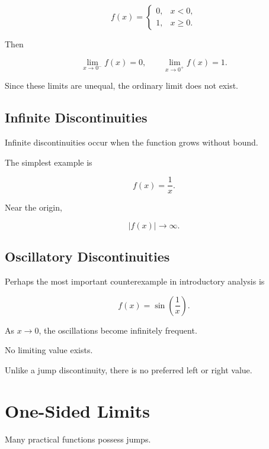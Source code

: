 \documentclass{essay}
\begin{document}
\begin{example}

  \[
    f(x)=
    \begin{cases}
      0,&x<0,\\
      1,&x\ge0.
    \end{cases}
  \]

  Then

  \[ \lim_{x\to0^-}f(x)=0, \qquad \lim_{x\to0^+}f(x)=1. \]

  Since these limits are unequal, the ordinary limit does not exist.

\end{example}


\subsection{Infinite Discontinuities}

Infinite discontinuities occur when the function grows without bound.

The simplest example is

\[ f(x)=\frac{1}{x}. \]

Near the origin,

\[ |f(x)|\rightarrow\infty. \]


\subsection{Oscillatory Discontinuities}

Perhaps the most important counterexample in introductory analysis is

\[ f(x)= \sin\left(\frac{1}{x}\right). \]

As \(x\rightarrow0\), the oscillations become infinitely frequent.

No limiting value exists.

Unlike a jump discontinuity, there is no preferred left or right value.


\section{One-Sided Limits}

Many practical functions possess jumps.
\end{document}
